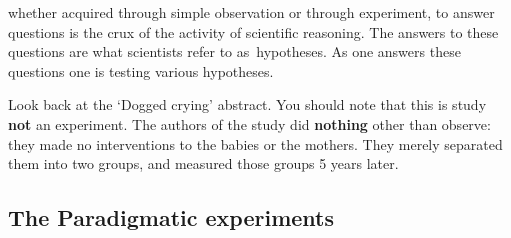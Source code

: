 \begin{refsection}
 whether acquired through simple observation or through experiment, to answer questions is the crux of the activity of scientific reasoning. The answers to these questions are what scientists refer to as hypotheses. As one answers these questions one is testing various hypotheses. 

Look back at the `Dogged crying' abstract. You should note that this is study \textbf{not} an experiment. The authors of the study did \textbf{nothing} other than observe: they made no interventions to the babies or the mothers. They merely separated them into two groups, and measured those groups 5 years later. 

\subsection{The Paradigmatic experiments}
\label{theparadigmaticexperiments}


\end{refsection}
